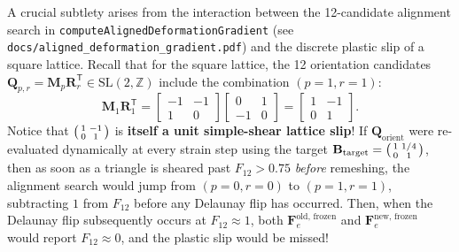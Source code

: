 \documentclass[11pt,a4paper]{article}
\newcommand{\Z}{\mathbb{Z}}
\newcommand{\T}{^{\mathsf T}}
\newcommand{\code}[1]{\texttt{#1}}
\begin{document}
A crucial subtlety arises from the interaction between the 12-candidate alignment search in \code{computeAlignedDeformationGradient} (see \code{docs/aligned\_deformation\_gradient.pdf}) and the discrete plastic slip of a square lattice. Recall that for the square lattice, the 12 orientation candidates $\mathbf{Q}_{p,r} = \mathbf{M}_p \mathbf{R}_r\T \in \mathrm{SL}(2,\Z)$ include the combination $(p=1, r=1)$:
\begin{equation}
  \mathbf{M}_1 \mathbf{R}_1\T =
  \begin{bmatrix} -1 & -1 \\ 1 & 0 \end{bmatrix}
  \begin{bmatrix} 0 & 1 \\ -1 & 0 \end{bmatrix}
  =
  \begin{bmatrix} 1 & -1 \\ 0 & 1 \end{bmatrix}.
\end{equation}
Notice that $\begin{psmallmatrix} 1 & -1 \\ 0 & 1 \end{psmallmatrix}$ is \textbf{itself a unit simple-shear lattice slip}! If $\mathbf{Q}_{\text{orient}}$ were re-evaluated dynamically at every strain step using the target $\mathbf{B}_{\text{target}} = \begin{psmallmatrix} 1 & 1/4 \\ 0 & 1 \end{psmallmatrix}$, then as soon as a triangle is sheared past $F_{12} > 0.75$ \emph{before} remeshing, the alignment search would jump from $(p=0, r=0)$ to $(p=1, r=1)$, subtracting $1$ from $F_{12}$ before any Delaunay flip has occurred. Then, when the Delaunay flip subsequently occurs at $F_{12} \approx 1$, both $\mathbf{F}_e^{\text{old, frozen}}$ and $\mathbf{F}_e^{\text{new, frozen}}$ would report $F_{12} \approx 0$, and the plastic slip would be missed!
\end{document}

